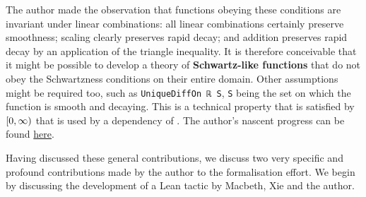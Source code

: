 The author made the observation that functions obeying these conditions are invariant under linear combinations: all linear combinations certainly preserve smoothness; scaling clearly preserves rapid decay; and addition preserves rapid decay by an application of the triangle inequality. It is therefore conceivable that it might be possible to develop a theory of \textbf{Schwartz-like functions} that do not obey the Schwartzness conditions on their entire domain. Other assumptions might be required too, such as \lstinline|UniqueDiffOn ℝ S|, \lstinline|S| being the set on which the function is smooth and decaying. This is a technical property that is satisfied by $\left[0, \infty\right)$ that is used by a dependency of . The author's nascent progress can be found \href{https://github.com/thefundamentaltheor3m/Sphere-Packing-Lean/blob/b1d9ae9aed06b87cb811fc4b94c2c659519053b0/SpherePacking/ForMathlib/RadialSchwartz/SchwartzLike.lean#L1}{here}.

Having discussed these general contributions, we discuss two very specific and profound contributions made by the author to the formalisation effort. We begin by discussing the development of a Lean tactic by Macbeth, Xie and the author.